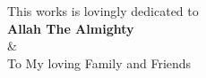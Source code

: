 \vspace*{\fill}
\begin{center}
	This works is lovingly dedicated to \\
	{\LARGE \textbf{Allah The Almighty}} \\
	\& \\
	To My loving Family and Friends
\end{center}
\vspace*{\fill}
\vspace{0.5cm}